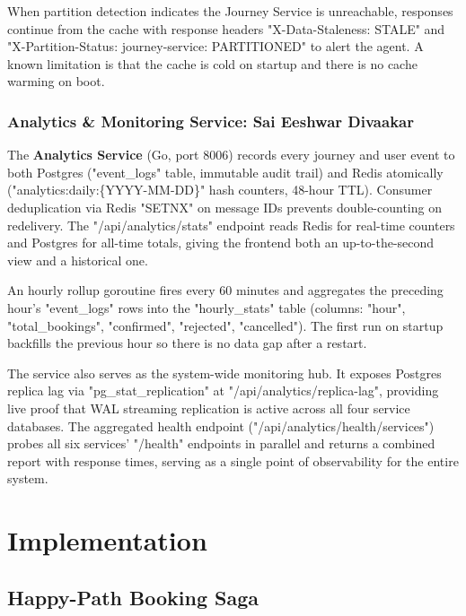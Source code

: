 \documentclass[11pt,a4paper]{article}
\begin{document}
When partition detection indicates the Journey Service is unreachable, responses continue from the cache with response headers "X-Data-Staleness: STALE" and "X-Partition-Status: journey-service: PARTITIONED" to alert the agent. A known limitation is that the cache is cold on startup and there is no cache warming on boot.
 
\subsubsection{Analytics \& Monitoring Service: Sai Eeshwar Divaakar}
 
The \textbf{Analytics Service} (Go, port 8006) records every journey and user event to both Postgres ("event\_logs" table, immutable audit trail) and Redis atomically ("analytics:daily:\{YYYY-MM-DD\}" hash counters, 48-hour TTL). Consumer deduplication via Redis "SETNX" on message IDs prevents double-counting on redelivery. The "/api/analytics/stats" endpoint reads Redis for real-time counters and Postgres for all-time totals, giving the frontend both an up-to-the-second view and a historical one.

An hourly rollup goroutine fires every 60 minutes and aggregates the preceding hour's "event\_logs" rows into the "hourly\_stats" table (columns: "hour", "total\_bookings", "confirmed", "rejected", "cancelled"). The first run on startup backfills the previous hour so there is no data gap after a restart.

The service also serves as the system-wide monitoring hub. It exposes Postgres replica lag via "pg\_stat\_replication" at "/api/analytics/replica-lag", providing live proof that WAL streaming replication is active across all four service databases. The aggregated health endpoint ("/api/analytics/health/services") probes all six services' "/health" endpoints in parallel and returns a combined report with response times, serving as a single point of observability for the entire system.




\section{Implementation}
\label{sec:implementation}

\subsection{Happy-Path Booking Saga}
\end{document}
